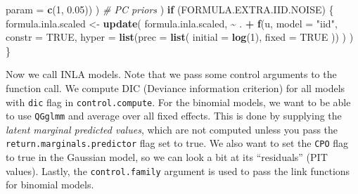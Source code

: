 \documentclass[
]{article}
\newenvironment{Shaded}{\begin{snugshade}}{\end{snugshade}}
\newcommand{\AttributeTok}[1]{\textcolor[rgb]{0.13,0.29,0.53}{#1}}
\newcommand{\CommentTok}[1]{\textcolor[rgb]{0.56,0.35,0.01}{\textit{#1}}}
\newcommand{\ConstantTok}[1]{\textcolor[rgb]{0.56,0.35,0.01}{#1}}
\newcommand{\ControlFlowTok}[1]{\textcolor[rgb]{0.13,0.29,0.53}{\textbf{#1}}}
\newcommand{\DecValTok}[1]{\textcolor[rgb]{0.00,0.00,0.81}{#1}}
\newcommand{\FloatTok}[1]{\textcolor[rgb]{0.00,0.00,0.81}{#1}}
\newcommand{\FunctionTok}[1]{\textcolor[rgb]{0.13,0.29,0.53}{\textbf{#1}}}
\newcommand{\NormalTok}[1]{#1}
\newcommand{\OtherTok}[1]{\textcolor[rgb]{0.56,0.35,0.01}{#1}}
\newcommand{\SpecialCharTok}[1]{\textcolor[rgb]{0.81,0.36,0.00}{\textbf{#1}}}
\newcommand{\StringTok}[1]{\textcolor[rgb]{0.31,0.60,0.02}{#1}}
\begin{document}
\begin{Shaded}
\begin{Highlighting}[]
                  \AttributeTok{param =} \FunctionTok{c}\NormalTok{(}\DecValTok{1}\NormalTok{, }\FloatTok{0.05}\NormalTok{))}
\NormalTok{    ) }\CommentTok{\# PC priors}
\NormalTok{  )}
\ControlFlowTok{if}\NormalTok{ (FORMULA.EXTRA.IID.NOISE) \{}
\NormalTok{  formula.inla.scaled }\OtherTok{\textless{}{-}} \FunctionTok{update}\NormalTok{(}
\NormalTok{    formula.inla.scaled,}
    \SpecialCharTok{\textasciitilde{}}\NormalTok{ . }\SpecialCharTok{+} \FunctionTok{f}\NormalTok{(u,}
      \AttributeTok{model =} \StringTok{"iid"}\NormalTok{, }\AttributeTok{constr =} \ConstantTok{TRUE}\NormalTok{,}
      \AttributeTok{hyper =} \FunctionTok{list}\NormalTok{(}\AttributeTok{prec =} \FunctionTok{list}\NormalTok{(}
        \AttributeTok{initial =} \FunctionTok{log}\NormalTok{(}\DecValTok{1}\NormalTok{),}
        \AttributeTok{fixed =} \ConstantTok{TRUE}
\NormalTok{      ))}
\NormalTok{    )}
\NormalTok{  )}
\NormalTok{\}}
\end{Highlighting}
\end{Shaded}

Now we call INLA models. Note that we pass some control arguments to the
function call. We compute DIC (Deviance information criterion) for all
models with \texttt{dic} flag in \texttt{control.compute}. For the
binomial models, we want to be able to use \texttt{QGglmm} and average
over all fixed effects. This is done by supplying the \emph{latent
marginal predicted values}, which are not computed unless you pass the
\texttt{return.marginals.predictor} flag set to true. We also want to
set the \texttt{CPO} flag to true in the Gaussian model, so we can look
a bit at its ``residuals'' (PIT values). Lastly, the
\texttt{control.family} argument is used to pass the link functions for
binomial models.
\end{document}

